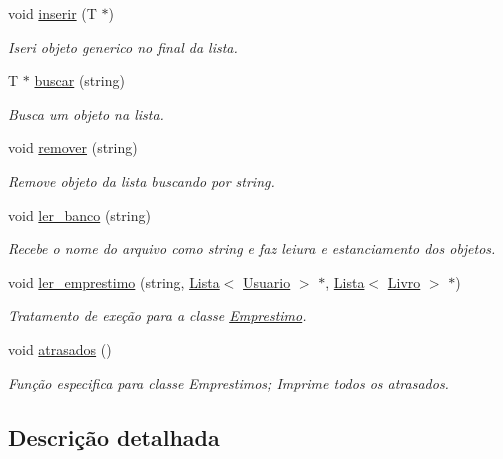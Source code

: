 \begin{DoxyCompactItemize}
void \hyperlink{class_lista_ad28575300ce0ead7f45750986e9d66ed}{inserir} (T $\ast$)
\begin{DoxyCompactList}\small\item\em Iseri objeto generico no final da lista. \end{DoxyCompactList}\item 
T $\ast$ \hyperlink{class_lista_a06cc21664e4ee2ec7813e01fcfe9f1c0}{buscar} (string)
\begin{DoxyCompactList}\small\item\em Busca um objeto na lista. \end{DoxyCompactList}\item 
void \hyperlink{class_lista_a7ff5378a21816a595bdf4fd164c9a53b}{remover} (string)
\begin{DoxyCompactList}\small\item\em Remove objeto da lista buscando por string. \end{DoxyCompactList}\item 
void \hyperlink{class_lista_ae3773452776dd52eb86684969cbf5a79}{ler\+\_\+banco} (string)
\begin{DoxyCompactList}\small\item\em Recebe o nome do arquivo como string e faz leiura e estanciamento dos objetos. \end{DoxyCompactList}\item 
void \hyperlink{class_lista_a5e8e038019f627e14b99fa0cc52618fc}{ler\+\_\+emprestimo} (string, \hyperlink{class_lista}{Lista}$<$ \hyperlink{class_usuario}{Usuario} $>$ $\ast$, \hyperlink{class_lista}{Lista}$<$ \hyperlink{class_livro}{Livro} $>$ $\ast$)
\begin{DoxyCompactList}\small\item\em Tratamento de exeção para a classe \hyperlink{class_emprestimo}{Emprestimo}. \end{DoxyCompactList}\item 
void \hyperlink{class_lista_acf387f2919c79e5ed8f8c17ab657f1a1}{atrasados} ()
\begin{DoxyCompactList}\small\item\em Função especifica para classe Emprestimos; Imprime todos os atrasados. \end{DoxyCompactList}\end{DoxyCompactItemize}


\subsection{Descrição detalhada}

